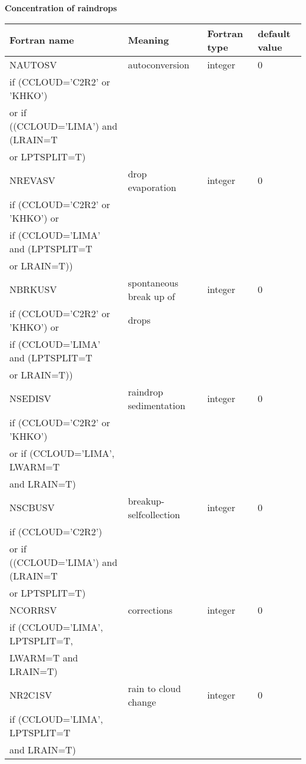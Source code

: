 \textbf{Concentration of raindrops}
\begin{longtable} {|p{}|p{}|>{\centering}p{}|p{}<{\centering}|}
\hline
Fortran name & Meaning & Fortran type & default value \\
\hline \hline
\endhead
NAUTOSV & autoconversion & integer & 0 \\ \nopagebreak
if (CCLOUD='C2R2' or 'KHKO') &&& \\ \nopagebreak
or if ((CCLOUD='LIMA') and (LRAIN=T &&& \\ \nopagebreak
or LPTSPLIT=T) &&& \\\hline

NREVASV & drop evaporation & integer & 0 \\ \nopagebreak
if (CCLOUD='C2R2' or 'KHKO') or &&& \\ \nopagebreak
if (CCLOUD='LIMA' and (LPTSPLIT=T &&& \\ \nopagebreak
or LRAIN=T)) &&& \\\hline

NBRKUSV & spontaneous break up of  & integer & 0 \\ \nopagebreak
if (CCLOUD='C2R2' or 'KHKO') or & drops && \\ \nopagebreak
if (CCLOUD='LIMA' and (LPTSPLIT=T &&& \\ \nopagebreak
or LRAIN=T)) &&& \\\hline

NSEDISV & raindrop sedimentation& integer & 0 \\ \nopagebreak
if (CCLOUD='C2R2' or 'KHKO') &&& \\ \nopagebreak
or if (CCLOUD='LIMA', LWARM=T &&& \\ \nopagebreak
and LRAIN=T) &&& \\\hline

NSCBUSV & breakup-selfcollection & integer & 0 \\ \nopagebreak
if (CCLOUD='C2R2') &&& \\ \nopagebreak
or if ((CCLOUD='LIMA') and (LRAIN=T &&& \\ \nopagebreak
or LPTSPLIT=T) &&& \\\hline

NCORRSV & corrections & integer & 0 \\ \nopagebreak
if (CCLOUD='LIMA', LPTSPLIT=T, &&& \\ \nopagebreak
LWARM=T and LRAIN=T) &&& \\\hline

NR2C1SV & rain to cloud change& integer & 0 \\ \nopagebreak
if (CCLOUD='LIMA', LPTSPLIT=T &&& \\ \nopagebreak
and LRAIN=T) &&& \\\hline


\end{longtable}
